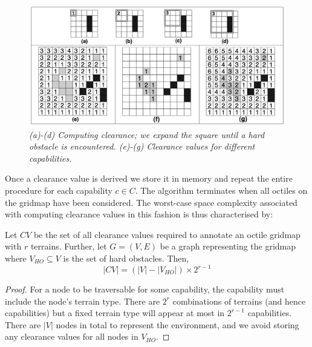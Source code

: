 \begin{figure}[htbp]
	\vspace{-9pt}
       \caption{\emph{(a)-(d) Computing clearance; we expand the square until a hard obstacle is encountered. (e)-(g) Clearance values for different capabilities.} \vspace{0.5em}}
       \begin{center}
                       \includegraphics[scale=0.20, trim = 20mm 9mm 20mm 0mm]{diagrams/annotations.png}
       \end{center}
       \label{aha-fig:annotations}
	\vspace{-6pt}
\end{figure}

Once a clearance value is derived we store it in memory and repeat the entire procedure for each capability $c \in C$.  
The algorithm terminates when all octiles on the gridmap have been considered. 
The worst-case space complexity associated with computing clearance values in this fashion is thus characterised by: 
\begin{lemma}
\label{aha-lemma:numannotations}
Let $CV$ be the set of all clearance values required to annotate an octile gridmap with $r$ terrains. Further, let $G = (V, E)$ be a graph representing the gridmap where $V_{HO} \subseteq V$ is the set of hard obstacles. Then, 
$$|CV| = (|V| - |V_{HO}|)\times 2^{r-1}$$
\end{lemma}

\begin{proof}
For a node to be traversable for some capability, the capability must include the node's terrain type. 
There are $2^{r}$ combinations of terrains (and hence capabilities) but a fixed terrain type will appear at most in $2^{r-1}$ capabilities. 
There are $|V|$ nodes in total to represent the environment, and we avoid storing any clearance values for all nodes in $V_{HO}$. 
\end{proof}


